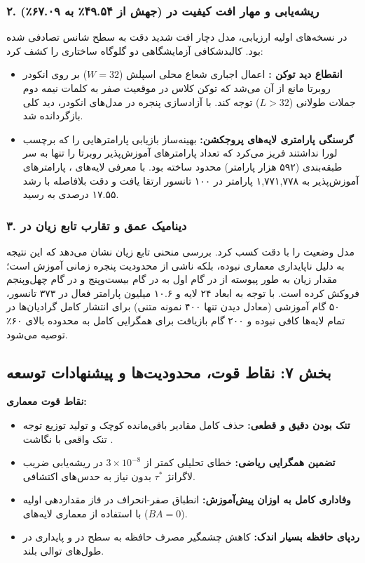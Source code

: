 \subsubsection*{۲. ریشه‌یابی و مهار افت کیفیت در  (جهش از ۴۹.۵۴٪ به ۶۷.۰۹٪)}
در نسخه‌های اولیه ارزیابی، مدل  دچار افت شدید دقت به سطح شانس تصادفی  شده بود. کالبدشکافی آزمایشگاهی دو گلوگاه ساختاری را کشف کرد:
\begin{itemize}
    \item \textbf{انقطاع دید توکن \lr{[CLS]}:} اعمال اجباری شعاع محلی اسپلش ($W=32$) بر روی انکودر روبرتا مانع از آن می‌شد که توکن کلاس در موقعیت صفر به کلمات نیمه دوم جملات طولانی ($L > 32$) توجه کند. با آزادسازی پنجره در مدل‌های انکودر، دید کلی بازگردانده شد.
    \item \textbf{گرسنگی پارامتری لایه‌های پروجکشن:} بهینه‌ساز بازیابی پارامترهایی را که برچسب لورا نداشتند فریز می‌کرد که تعداد پارامترهای آموزش‌پذیر روبرتا را تنها به سر طبقه‌بندی (۵۹۲ هزار پارامتر) محدود ساخته بود. با معرفی لایه‌های ، پارامترهای آموزش‌پذیر به ۱,۷۷۱,۷۷۸ پارامتر در ۱۰۰ تانسور ارتقا یافت و دقت بلافاصله با رشد ۱۷.۵۵ درصدی به  رسید.
\end{itemize}

\subsubsection*{۳. دینامیک عمق و تقارب تابع زیان در }
مدل  وضعیت  را با دقت  کسب کرد. بررسی منحنی تابع زیان نشان می‌دهد که این نتیجه به دلیل ناپایداری معماری نبوده، بلکه ناشی از محدودیت پنجره زمانی آموزش است؛ مقدار زیان به طور پیوسته از  در گام اول به  در گام بیست‌وپنج و  در گام چهل‌وپنجم فروکش کرده است. با توجه به ابعاد ۲۴ لایه و ۱۰.۶ میلیون پارامتر فعال در ۳۷۳ تانسور، ۵۰ گام آموزشی (معادل دیدن تنها ۴۰۰ نمونه متنی) برای انتشار کامل گرادیان‌ها در تمام لایه‌ها کافی نبوده و ۲۰۰ گام بازیافت برای همگرایی کامل به محدوده بالای ۶۰٪ توصیه می‌شود.

\subsection*{بخش ۷: نقاط قوت، محدودیت‌ها و پیشنهادات توسعه }
\textbf{نقاط قوت معماری:}
\begin{itemize}
    \item \textbf{تنک بودن دقیق و قطعی:} حذف کامل مقادیر باقی‌مانده کوچک و تولید توزیع توجه تنک واقعی با نگاشت .
    \item \textbf{تضمین همگرایی ریاضی:} خطای تحلیلی کمتر از $3 \times 10^{-8}$ در ریشه‌یابی ضریب لاگرانژ $\tau^*$ بدون نیاز به حدس‌های اکتشافی.
    \item \textbf{وفاداری کامل به اوزان پیش‌آموزش:} انطباق صفر-انحراف در فاز مقداردهی اولیه با استفاده از معماری لایه‌های  ($BA = 0$).
    \item \textbf{ردپای حافظه بسیار اندک:} کاهش چشمگیر مصرف حافظه به سطح  در  و پایداری در طول‌های توالی بلند.
\end{itemize}

